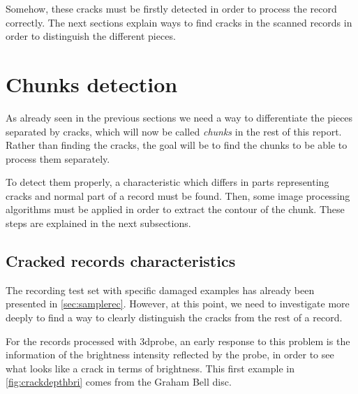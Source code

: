 Somehow, these cracks must be firstly detected in order to process the record correctly. The next sections explain ways to find cracks in the scanned records in order to distinguish the different pieces.

\section{Chunks detection}

As already seen in the previous sections we need a way to differentiate the pieces separated by cracks, which will now be called \emph{chunks} in the rest of this report. Rather than finding the cracks, the goal will be to find the chunks to be able to process them separately.

To detect them properly, a characteristic which differs in parts representing cracks and normal part of a record must be found. Then, some image processing algorithms must be applied in order to extract the contour of the chunk. These steps are explained in the next subsections.

\subsection{Cracked records characteristics}
\label{sec:crackrecchar}

The recording test set with specific damaged examples has already been presented in \autoref{sec:samplerec}. However, at this point, we need to investigate more deeply to find a way to clearly distinguish the cracks from the rest of a record.

For the records processed with \gls{3dprobe}, an early response to this problem is the information of the brightness intensity reflected by the probe, in order to see what looks like a crack in terms of brightness. This first example in \autoref{fig:crackdepthbri} comes from the Graham Bell disc.

